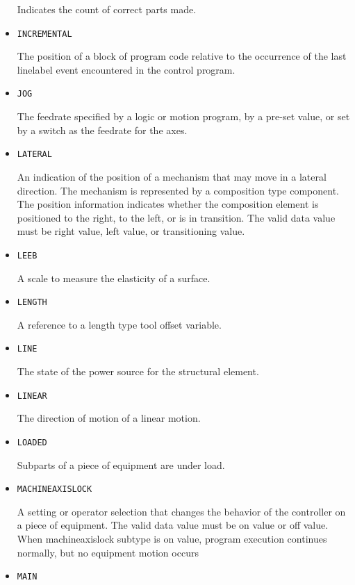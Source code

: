\begin{itemize}
Indicates the count of correct parts made.


\item \texttt{INCREMENTAL}  

The position of a block of program code relative to the occurrence of the last linelabel event encountered in the control program.


\item \texttt{JOG}  

The feedrate specified by a logic or motion program, by a pre-set value, or set by a switch as the feedrate for the axes. 


\item \texttt{LATERAL}  

An indication of the position of a mechanism that may move in a lateral direction.   The mechanism is represented by a composition type component. 
 The position information indicates whether the composition element is positioned to the right, to the left, or is in transition.  
 The valid data value must be right value, left value, or transitioning value.


\item \texttt{LEEB}  

A scale to measure the elasticity of a surface.


\item \texttt{LENGTH}  

A reference to a length type tool offset variable.


\item \texttt{LINE}  

The state of the power source for the structural element.


\item \texttt{LINEAR}  

The direction of motion of a linear motion.


\item \texttt{LOADED}  

Subparts of a piece of equipment are under load.


\item \texttt{MACHINE\textunderscore AXIS\textunderscore LOCK}  

A setting or operator selection that changes the behavior of the controller on a piece of equipment. 
 The valid data value must be on value or off value. 
 When machineaxislock subtype is on value, program execution continues normally, but no equipment motion occurs 


\item \texttt{MAIN}  


\end{itemize}
